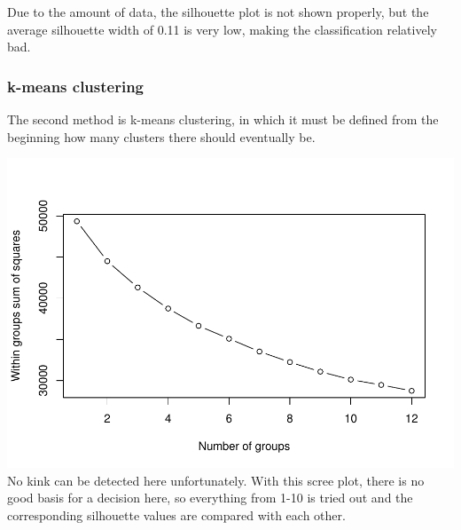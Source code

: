 \documentclass[
]{article}
\newenvironment{Shaded}{\begin{snugshade}}{\end{snugshade}}
\newcommand{\AttributeTok}[1]{\textcolor[rgb]{0.77,0.63,0.00}{#1}}
\newcommand{\CommentTok}[1]{\textcolor[rgb]{0.56,0.35,0.01}{\textit{#1}}}
\newcommand{\ControlFlowTok}[1]{\textcolor[rgb]{0.13,0.29,0.53}{\textbf{#1}}}
\newcommand{\DecValTok}[1]{\textcolor[rgb]{0.00,0.00,0.81}{#1}}
\newcommand{\DocumentationTok}[1]{\textcolor[rgb]{0.56,0.35,0.01}{\textbf{\textit{#1}}}}
\newcommand{\FunctionTok}[1]{\textcolor[rgb]{0.00,0.00,0.00}{#1}}
\newcommand{\NormalTok}[1]{#1}
\newcommand{\OtherTok}[1]{\textcolor[rgb]{0.56,0.35,0.01}{#1}}
\newcommand{\SpecialCharTok}[1]{\textcolor[rgb]{0.00,0.00,0.00}{#1}}
\newcommand{\StringTok}[1]{\textcolor[rgb]{0.31,0.60,0.02}{#1}}
\begin{document}
Due to the amount of data, the silhouette plot is not shown properly,
but the average silhouette width of 0.11 is very low, making the
classification relatively bad.

\hypertarget{k-means-clustering}{%
\subsubsection{k-means clustering}\label{k-means-clustering}}

The second method is k-means clustering, in which it must be defined
from the beginning how many clusters there should eventually be.

\begin{Shaded}
\end{Shaded}

\includegraphics{Influence_factors_files/figure-latex/3.05_kmeans1_munic-1.pdf}
No kink can be detected here unfortunately. With this scree plot, there
is no good basis for a decision here, so everything from 1-10 is tried
out and the corresponding silhouette values are compared with each
other.
\end{document}
